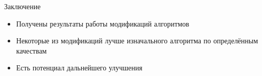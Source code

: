 \documentclass{beamer}
\begin{document}
\begin{frame}{Заключение}
  \begin{itemize}
      \item Получены результаты работы модификаций алгоритмов
      \item Некоторые из модификаций лучше изначального алгоритма по определённым качествам
      \item Есть потенциал дальнейшего улучшения
  \end{itemize}
\end{frame}
\end{document}
